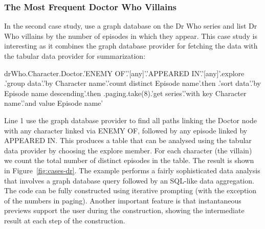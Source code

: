 \documentclass[manuscript,review,anonymous]{acmart}
\newcommand{\ikvd}[1]{{\fontfamily{zi4}\selectfont\small #1}}
\begin{document}
\subsubsection*{The Most Frequent Doctor Who Villains}
In the second case study, use a graph database on the Dr Who series and list Dr Who villains
by the number of episodes in which they appear. This case study is interesting as it
combines the graph database provider for fetching the data with the tabular data provider for
summarization:

\begin{thegamma}
drWho.Character.Doctor.'ENEMY OF'.'[any]'.'APPEARED IN'.'[any]'.explore
  .'group data'.'by Character name'.'count distinct Episode name'.then
  .'sort data'.'by Episode name descending'.then
  .paging.take(8).'get series'.'with key Character name'.'and value Episode name'
\end{thegamma}

\noindent
Line 1 use the graph database provider to find all paths linking the Doctor node with any
character linked via \ikvd{ENEMY OF}, followed by any episode linked by \ikvd{APPEARED IN}.
This produces a table that can be analysed using the tabular data provider by choosing the
\ikvd{explore} member. For each character (the villain) we count the total number of
distinct episodes in the table. The result is shown in Figure~\ref{fig:cases-dr}.
The example performs a fairly sophisticated data analysis that involves a graph database query
followed by an SQL-like data aggregation. The code can be fully constructed using iterative
prompting (with the exception of the numbers in paging). Another important feature is that
instantaneous previews support the user during the construction, showing the intermediate result
at each step of the construction.


\end{document}

